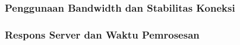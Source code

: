 \subsubsection{Penggunaan Bandwidth dan Stabilitas Koneksi}




\subsubsection{Respons Server dan Waktu Pemrosesan}



